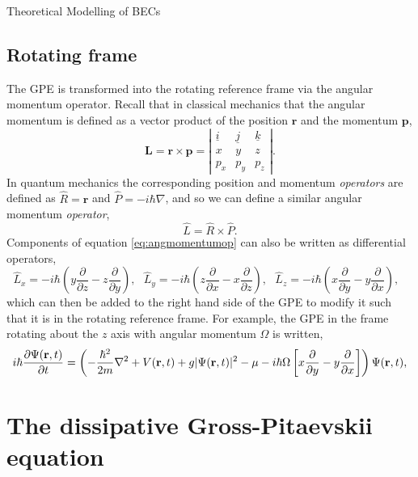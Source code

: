 \begin{chapter}{\label{cha:theoretical_model}Theoretical Modelling of BECs}
	\subsection{\label{section:rotatingframe} Rotating frame}
	The GPE is transformed into the rotating reference frame via the angular momentum operator. Recall that in classical mechanics that the angular momentum is defined as a vector product of the position $\mathbf{r}$ and the momentum $\mathbf{p}$,
	\begin{equation*}
		\mathbf{L} = \mathbf{r} \times \mathbf{p} = 
		\left| \begin{array}{ccc}
\underline{i} & \underline{j} & \underline{k} \\
x & y & z \\
p_x & p_y & p_z \end{array} \right|.
	\end{equation*}
	In quantum mechanics the corresponding position and momentum {\it operators} are defined as $\hat{R} = \mathbf{r}$ and $\hat{P} = -i\hbar\nabla$, and so we can define a similar angular momentum {\it operator},
	\begin{equation}\label{eq:angmomentumop}
		\hat{L} = \hat{R} \times \hat{P}.
	\end{equation}
	Components of equation \ref{eq:angmomentumop} can also be written as differential operators,
	\begin{equation}
		\hat{L}_x = -i\hbar\left ( y \frac{\partial}{\partial z} - z \frac{\partial}{\partial y} \right ),~~~
		\hat{L}_y = -i\hbar\left ( z \frac{\partial}{\partial x} - x \frac{\partial}{\partial z} \right ),~~~
		\hat{L}_z = -i\hbar\left ( x \frac{\partial}{\partial y} - y \frac{\partial}{\partial x} \right ),~~~
	\end{equation}
 which can then be added to the right hand side of the GPE to modify it such that it is in the rotating reference frame. For example, the GPE in the frame rotating about the $z$ axis with angular momentum $\Omega$ is written,
	\begin{equation}\label{eq:rotframegpe}
	i\hbar \frac{\partial\Psi({\bf r},t)}{\partial t} = \left(-\frac{\hbar^2}{2m}\nabla^2 + V({\bf r},t) + g|\Psi({\bf r},t)|^2 - \mu -i\hbar\Omega\left [ x \frac{\partial}{\partial y} - y \frac{\partial}{\partial x} \right ] \right ) \Psi({\bf r},t),
	\end{equation}


\section{\label{section:dgpe} The dissipative Gross-Pitaevskii equation}


\end{chapter}
